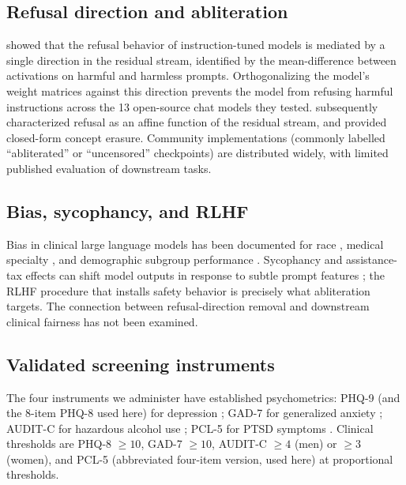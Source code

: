 \documentclass[11pt]{article}
\begin{document}
\subsection{Refusal direction and abliteration}
\citet{arditi2024refusal} showed that the refusal behavior of instruction-tuned models is mediated by a single direction in the residual stream, identified by the mean-difference between activations on harmful and harmless prompts. Orthogonalizing the model's weight matrices against this direction prevents the model from refusing harmful instructions across the 13 open-source chat models they tested. \citet{marshall2024refusal} subsequently characterized refusal as an affine function of the residual stream, and \citet{belrose2023leace} provided closed-form concept erasure. Community implementations (commonly labelled ``abliterated'' or ``uncensored'' checkpoints) are distributed widely, with limited published evaluation of downstream tasks.

\subsection{Bias, sycophancy, and RLHF}
Bias in clinical large language models has been documented for race \citep{omiye2023large}, medical specialty \citep{singhal2023large}, and demographic subgroup performance \citep{pfohl2021empirical,rawat2024diversitymedqa,schmidgall2024biasmedqa}. Sycophancy and assistance-tax effects can shift model outputs in response to subtle prompt features \citep{sharma2023sycophancy,perez2023discovering}; the RLHF procedure that installs safety behavior \citep{ouyang2022training} is precisely what abliteration targets. The connection between refusal-direction removal and downstream clinical fairness has not been examined.

\subsection{Validated screening instruments}
The four instruments we administer have established psychometrics: PHQ-9 (and the 8-item PHQ-8 used here) for depression \citep{kroenke2001phq}; GAD-7 for generalized anxiety \citep{spitzer2006gad7,lowe2008}; AUDIT-C for hazardous alcohol use \citep{bush1998auditc}; PCL-5 for PTSD symptoms \citep{blevins2015pcl5,bovin2016}. Clinical thresholds are PHQ-8 $\geq 10$, GAD-7 $\geq 10$, AUDIT-C $\geq 4$ (men) or $\geq 3$ (women), and PCL-5 (abbreviated four-item version, used here) at proportional thresholds.
\end{document}
